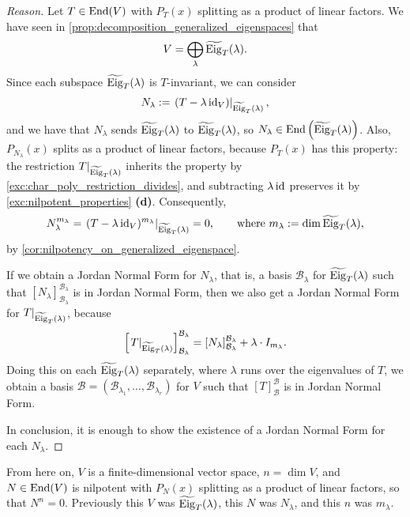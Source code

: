 \begin{proof}[Reason]
Let $T \in \operatorname{End}(V)$ with $P_T(x)$ splitting as a product of linear factors. We have seen in \cref{prop:decomposition_generalized_eigenspaces} that
\[
    V = \bigoplus_{\lambda} \widetilde{\operatorname{Eig}}_T(\lambda).
\]
Since each subspace $\widetilde{\operatorname{Eig}}_T(\lambda)$ is $T$-invariant, we can consider
\[
    N_\lambda := \left. (T - \lambda \operatorname{id}_V) \right|_{\widetilde{\operatorname{Eig}}_T(\lambda)},
\]
and we have that $N_\lambda$ sends $\widetilde{\operatorname{Eig}}_T(\lambda)$ to $\widetilde{\operatorname{Eig}}_T(\lambda)$, so $N_\lambda \in \operatorname{End}\left(\widetilde{\operatorname{Eig}}_T(\lambda)\right)$. Also, $P_{N_\lambda}(x)$ splits as a product of linear factors, because $P_T(x)$ has this property: the restriction $T|_{\widetilde{\operatorname{Eig}}_T(\lambda)}$ inherits the property by \cref{exc:char_poly_restriction_divides}, and subtracting $\lambda \operatorname{id}$ preserves it by \cref{exc:nilpotent_properties} \textbf{(d)}. Consequently,
\[
    N_\lambda^{m_\lambda} = \left. (T - \lambda \operatorname{id}_V)^{m_\lambda}\right|_{\widetilde{\operatorname{Eig}}_T(\lambda)} = 0, \qquad \text{where } m_\lambda := \dim \widetilde{\operatorname{Eig}}_T(\lambda),
\]
by \cref{cor:nilpotency_on_generalized_eigenspace}.

If we obtain a Jordan Normal Form for $N_\lambda$, that is, a basis $\mathcal{B}_\lambda$ for $\widetilde{\operatorname{Eig}}_T(\lambda)$ such that $[N_\lambda]_{\mathcal{B}_\lambda}^{\mathcal{B}_\lambda}$ is in Jordan Normal Form, then we also get a Jordan Normal Form for $T|_{\widetilde{\operatorname{Eig}}_T(\lambda)}$, because
\[
    \left[\left. T \right|_{\widetilde{\operatorname{Eig}}_T(\lambda)}\right]_{\mathcal{B}_\lambda}^{\mathcal{B}_\lambda} = [N_\lambda]_{\mathcal{B}_\lambda}^{\mathcal{B}_\lambda} + \lambda \cdot I_{m_\lambda}.
\]
Doing this on each $\widetilde{\operatorname{Eig}}_T(\lambda)$ separately, where $\lambda$ runs over the eigenvalues of $T$, we obtain a basis $\mathcal{B} = (\mathcal{B}_{\lambda_1}, \dots, \mathcal{B}_{\lambda_r})$ for $V$ such that $[T]_{\mathcal{B}}^{\mathcal{B}}$ is in Jordan Normal Form.

In conclusion, it is enough to show the existence of a Jordan Normal Form for each $N_\lambda$.
\end{proof}

\begin{remark}
\label{rem:change_of_notation_nilpotent}
From here on, $V$ is a finite-di\-men\-sional vector space, $n = \dim V$, and $N \in \operatorname{End}(V)$ is nilpotent with $P_N(x)$ splitting as a product of linear factors, so that $N^n = 0$. Previously this $V$ was $\widetilde{\operatorname{Eig}}_T(\lambda)$, this $N$ was $N_\lambda$, and this $n$ was $m_\lambda$.
\end{remark}

